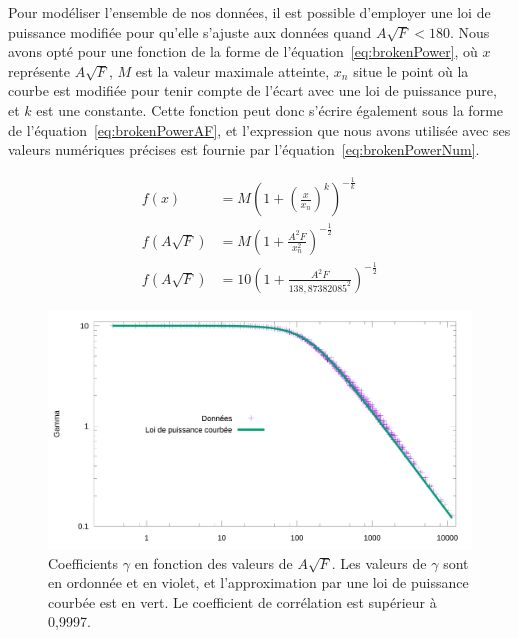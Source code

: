 	Pour modéliser l'ensemble de nos données, il est possible d'employer une loi de puissance modifiée pour qu'elle s'ajuste aux données quand $A\sqrt{F}<180$. Nous avons opté pour une fonction de la forme de l'équation~\ref{eq:brokenPower}, où $x$ représente $A\sqrt{F}$, $M$ est la valeur maximale atteinte, $x_{n}$ situe le point où la courbe est modifiée pour tenir compte de l'écart avec une loi de puissance pure, et $k$ est une constante. Cette fonction peut donc s'écrire également sous la forme de l'équation~\ref{eq:brokenPowerAF}, et l'expression que nous avons utilisée avec ses valeurs numériques précises est fournie par l'équation~\ref{eq:brokenPowerNum}.
	
	\begin{align}
		\label{eq:brokenPower}
		f(x) &= M \left( 1 + \left( \frac{x}{x_{n}} \right)^{k} \right)^{-\frac{1}{k}} \\
		\label{eq:brokenPowerAF}
		f(A\sqrt{F}) &= M \left( 1 + \frac{A^{2}F}{x_{n}^{2}}\right)^{-\frac{1}{2}} \\
		\label{eq:brokenPowerNum}
		f(A\sqrt{F}) &= 10 \left( 1 + \frac{A^{2}F}{138,87382085^{2}} \right)^{-\frac{1}{2}}
	\end{align}
	
	\begin{figure}[!htb]
		\centering
		\includegraphics[width=\textwidth]{figures/ch4/asqrtFVgammaLogLogPowerFit}
		\caption[Coefficients $\gamma$ vs. F et A, quinquies (log-log et loi de puissance)]{Coefficients $\gamma$ en fonction des valeurs de $A\sqrt{F}$. Les valeurs de $\gamma$ sont en ordonnée et en violet, et l'approximation par une loi de puissance courbée est en vert. Le coefficient de corrélation est supérieur à 0,9997.}
		\label{fig:asqrtFVgammaLogLogPowerFit}
	\end{figure}
	
